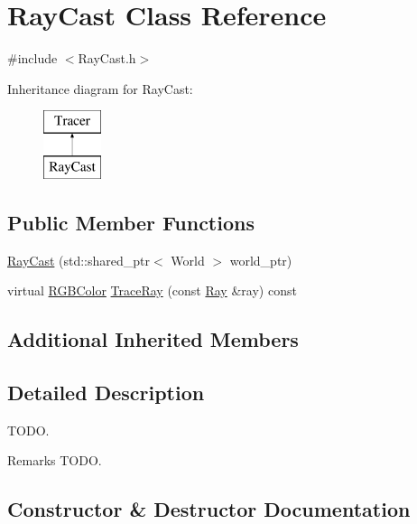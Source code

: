\hypertarget{class_ray_cast}{}\section{Ray\+Cast Class Reference}
\label{class_ray_cast}


{\ttfamily \#include $<$Ray\+Cast.\+h$>$}

Inheritance diagram for Ray\+Cast\+:\begin{figure}[H]
\begin{center}
\leavevmode
\includegraphics[height=2.000000cm]{class_ray_cast}
\end{center}
\end{figure}
\subsection*{Public Member Functions}
\begin{DoxyCompactItemize}
\item 
\hyperlink{class_ray_cast_adedb760a41eeb39a1ca797801727ae67}{Ray\+Cast} (std\+::shared\+\_\+ptr$<$ World $>$ world\+\_\+ptr)
\item 
virtual \hyperlink{class_r_g_b_color}{R\+G\+B\+Color} \hyperlink{class_ray_cast_aed24a822899e5328a7e668a479d3be9e}{Trace\+Ray} (const \hyperlink{class_ray}{Ray} \&ray) const
\end{DoxyCompactItemize}
\subsection*{Additional Inherited Members}


\subsection{Detailed Description}
T\+O\+DO. \begin{DoxyRemark}{Remarks}
T\+O\+DO. 
\end{DoxyRemark}


\subsection{Constructor \& Destructor Documentation}
\hypertarget{class_ray_cast_adedb760a41eeb39a1ca797801727ae67}{}\label{class_ray_cast_adedb760a41eeb39a1ca797801727ae67} 
